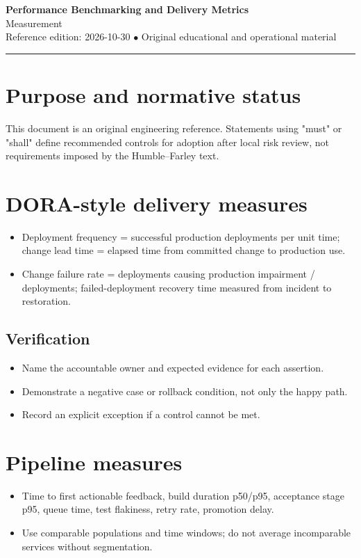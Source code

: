 \documentclass[10pt,letterpaper]{article}
\begin{document}
\begin{center}
{\LARGE\bfseries\color{cdblue}Performance Benchmarking and Delivery Metrics}\\[7pt]
{\large Measurement}\\[6pt]
{\small Reference edition: 2026-10-30 $\bullet$ Original educational and operational material}
\end{center}
\noindent\color{cdblue}\rule{\linewidth}{1.2pt}\color{black}
\vspace{0.4em}
\section{Purpose and normative status}
This document is an original engineering reference. Statements using "must" or "shall" define recommended controls for adoption after local risk review, not requirements imposed by the Humble--Farley text.


\section{DORA-style delivery measures}
\begin{itemize}
\item Deployment frequency = successful production deployments per unit time; change lead time = elapsed time from committed change to production use.
\item Change failure rate = deployments causing production impairment / deployments; failed-deployment recovery time measured from incident to restoration.
\end{itemize}
\subsection{Verification}
\begin{itemize}
\item Name the accountable owner and expected evidence for each assertion.
\item Demonstrate a negative case or rollback condition, not only the happy path.
\item Record an explicit exception if a control cannot be met.
\end{itemize}


\section{Pipeline measures}
\begin{itemize}
\item Time to first actionable feedback, build duration p50/p95, acceptance stage p95, queue time, test flakiness, retry rate, promotion delay.
\item Use comparable populations and time windows; do not average incomparable services without segmentation.
\end{itemize}
\end{document}
